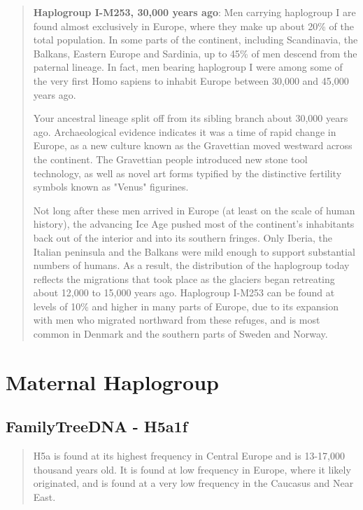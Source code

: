 \documentclass[11pt,letter]{book}
\begin{document}
\begin{quote}
\textbf{Haplogroup I-M253, 30,000 years ago}:  Men carrying haplogroup I are found almost exclusively in Europe, where they make up about 20\% of the total population. In some parts of the continent, including Scandinavia, the Balkans, Eastern Europe and Sardinia, up to 45\% of men descend from the paternal lineage. In fact, men bearing haplogroup I were among some of the very first Homo sapiens to inhabit Europe between 30,000 and 45,000 years ago.

Your ancestral lineage split off from its sibling branch about 30,000 years ago. Archaeological evidence indicates it was a time of rapid change in Europe, as a new culture known as the Gravettian moved westward across the continent. The Gravettian people introduced new stone tool technology, as well as novel art forms typified by the distinctive fertility symbols known as "Venus" figurines. 

Not long after these men arrived in Europe (at least on the scale of human history), the advancing Ice Age pushed most of the continent's inhabitants back out of the interior and into its southern fringes. Only Iberia, the Italian peninsula and the Balkans were mild enough to support substantial numbers of humans. As a result, the distribution of the haplogroup today reflects the migrations that took place as the glaciers began retreating about 12,000 to 15,000 years ago. Haplogroup I-M253 can be found at levels of 10\% and higher in many parts of Europe, due to its expansion with men who migrated northward from these refuges, and is most common in Denmark and the southern parts of Sweden and Norway.
\end{quote}

\section{Maternal Haplogroup}

\subsection{FamilyTreeDNA - H5a1f}

\begin{quote}
H5a is found at its highest frequency in Central Europe and is 13-17,000 thousand years old. It is found at low frequency in Europe, where it likely originated, and is found at a very low frequency in the Caucasus and Near East.
\end{quote}
\end{document}
